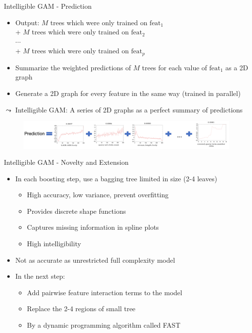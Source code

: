 \documentclass[11pt,compress,t,notes=noshow, aspectratio=169, xcolor=table]{beamer}
\begin{document}
\begin{frame}{Intelligible GAM - Prediction}
\begin{itemize}
    \item Output: $M$ trees which were only trained on $\text{feat}_1$ \\
    \qquad\;\; + $M$ trees which were only trained on $\text{feat}_2$ \\
    \qquad\;\; $\cdots$ \\
    \qquad\;\; + $M$ trees which were only trained on $\text{feat}_p$
    \item Summarize the weighted predictions of $M$ trees for each value of $\text{feat}_1$ as a 2D graph
    \item Generate a 2D graph for every feature in the same way (trained in parallel)
\end{itemize}
\quad $\leadsto$ Intelligible GAM: A series of 2D graphs as a perfect summary of predictions
\begin{figure}
    \centering
    \includegraphics[width=1.3\linewidth]{slides//02_interpretable-models//figure/ebm_prediction.png}
    \label{fig:Intelligible ebm_prediction}
\end{figure}
\end{frame}

\begin{frame}{Intelligible GAM - Novelty and Extension}
\begin{itemize}
    \item In each boosting step, use a bagging tree limited in size (2-4 leaves) \begin{itemize}
        \item High accuracy, low variance, prevent overfitting
        \item Provides discrete shape functions
        \item Captures missing information in spline plots
        \item High intelligibility
    \end{itemize}
    \item Not as accurate as unrestricted full complexity model
    \item In the next step: 
    \begin{itemize}
        \item Add pairwise feature interaction terms to the model
        \item Replace the 2-4 regions of small tree
        \item By a dynamic programming algorithm called FAST
    \end{itemize}
\end{itemize}
\end{frame}
\end{document}
